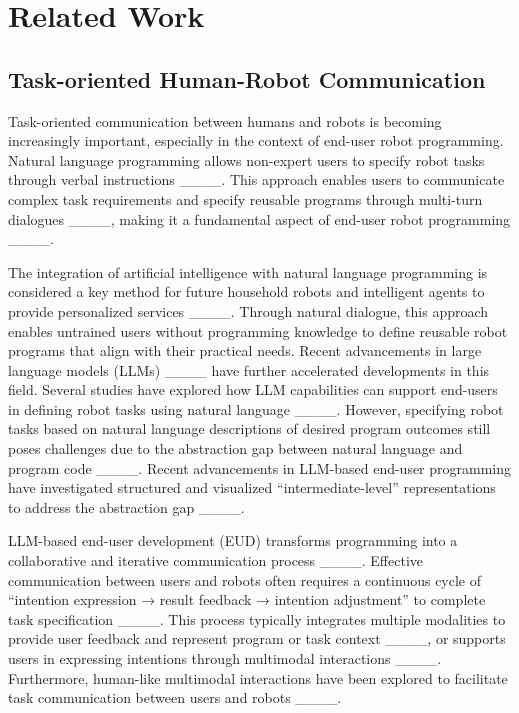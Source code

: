 \section{Related Work}
\subsection{Task-oriented Human-Robot Communication}


Task-oriented communication between humans and robots is becoming increasingly important, especially in the context of end-user robot programming. Natural language programming allows non-expert users to specify robot tasks through verbal instructions ____. This approach enables users to communicate complex task requirements and specify reusable programs through multi-turn dialogues ____, making it a fundamental aspect of end-user robot programming ____.

The integration of artificial intelligence with natural language programming is considered a key method for future household robots and intelligent agents to provide personalized services ____. 
Through natural dialogue, this approach enables untrained users without programming knowledge to define reusable robot programs that align with their practical needs.
Recent advancements in large language models (LLMs) 
____ have further accelerated developments in this field. Several studies have explored how LLM capabilities can support end-users in defining robot tasks using natural language ____. 
However, specifying robot tasks based on natural language descriptions of desired program outcomes still poses challenges due to the abstraction gap between natural language and program code ____.
Recent advancements in LLM-based end-user programming have investigated structured and visualized “intermediate-level” representations to address the abstraction gap ____.

LLM-based end-user development (EUD) transforms programming into a collaborative and iterative communication process ____.
Effective communication between users and robots often requires a continuous cycle of ``intention expression → result feedback → intention adjustment'' to complete task specification ____. This process typically integrates multiple modalities to provide user feedback and represent program or task context ____, or supports users in expressing intentions through multimodal interactions ____. Furthermore, human-like multimodal interactions have been explored to facilitate task communication between users and robots ____.




